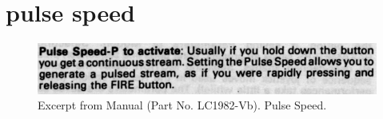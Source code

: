 \clearpage
\section*{pulse speed} 
\label{sec:pulse_speed}
\lstset{style=6502Style}

\begin{figure}[H]
    \centering
    \begin{adjustbox}{width=10.5cm,margin=0cm}
      \includegraphics[width=12cm]{src/pulsespeed/pulsespeed.png}%
    \end{adjustbox}
    \caption{
      Excerpt from Manual (Part No. LC1982-Vb). Pulse Speed.
      }
\end{figure}


